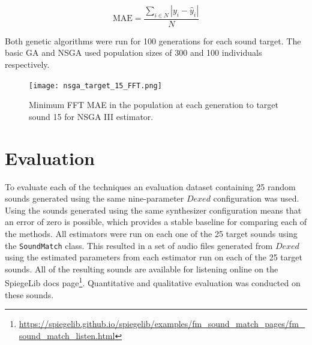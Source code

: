\begin{equation}
    \text{MAE} = \frac{\sum_{i \in N}{|y_i - \hat{y}_i|}}{N}
\end{equation}

Both genetic algorithms were run for 100 generations for each sound target. The basic GA and NSGA used population sizes of 300 and 100 individuals respectively. 



\begin{figure}[ht]
\begin{center}
\texttt{[image: nsga\_target\_15\_FFT.png]}
\caption{Minimum FFT MAE in the population at each generation to target sound 15 for NSGA III estimator.}
\label{fig:nsga_fitness}
\end{center}
\end{figure}

\section{Evaluation}
\label{sec:inverse-synth-eval}

To evaluate each of the techniques an evaluation dataset containing 25 random sounds generated using the same nine-parameter $Dexed$ configuration was used. Using the sounds generated using the same synthesizer configuration means that an error of zero is possible, which provides a stable baseline for comparing each of the methods. All estimators were run on each one of the 25 target sounds using the \texttt{SoundMatch} class. This resulted in a set of audio files generated from $Dexed$ using the estimated parameters from each estimator run on each of the 25 target sounds. All of the resulting sounds are available for listening online on the SpiegeLib docs page\footnote{\url{https://spiegelib.github.io/spiegelib/examples/fm_sound_match_pages/fm_sound_match_listen.html}}. Quantitative and qualitative evaluation was conducted on these sounds.

